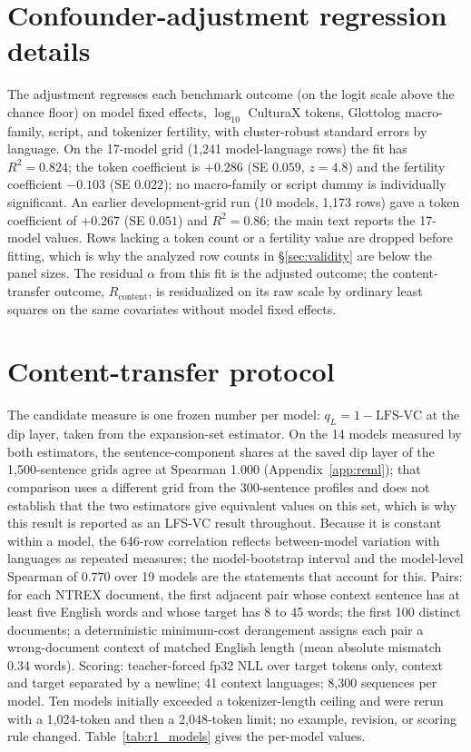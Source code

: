 \documentclass{article} %
\begin{document}
\section{Confounder-adjustment regression details}
\label{app:deflation}
The adjustment regresses each benchmark outcome (on the logit scale above the chance floor) on model fixed effects, $\log_{10}$ CulturaX tokens, Glottolog macro-family, script, and tokenizer fertility, with cluster-robust standard errors by language. On the 17-model grid (1,241 model-language rows) the fit has $R^2 = 0.824$; the token coefficient is $+0.286$ (SE $0.059$, $z = 4.8$) and the fertility coefficient $-0.103$ (SE $0.022$); no macro-family or script dummy is individually significant. An earlier development-grid run (10 models, 1,173 rows) gave a token coefficient of $+0.267$ (SE $0.051$) and $R^2 = 0.86$; the main text reports the 17-model values. Rows lacking a token count or a fertility value are dropped before fitting, which is why the analyzed row counts in \S\ref{sec:validity} are below the panel sizes. The residual $\alpha$ from this fit is the adjusted outcome; the content-transfer outcome, $R_{\mathrm{content}}$, is residualized on its raw scale by ordinary least squares on the same covariates without model fixed effects.

\section{Content-transfer protocol}
\label{app:r1}
The candidate measure is one frozen number per model: $q_L = 1 - \mathrm{LFS\text{-}VC}$ at the dip layer, taken from the expansion-set estimator. On the 14 models measured by both estimators, the sentence-component shares at the saved dip layer of the 1,500-sentence grids agree at Spearman 1.000 (Appendix~\ref{app:reml}); that comparison uses a different grid from the 300-sentence profiles and does not establish that the two estimators give equivalent values on this set, which is why this result is reported as an LFS-VC result throughout. Because it is constant within a model, the 646-row correlation reflects between-model variation with languages as repeated measures; the model-bootstrap interval and the model-level Spearman of $0.770$ over 19 models are the statements that account for this.
Pairs: for each NTREX document, the first adjacent pair whose context sentence has at least five English words and whose target has 8 to 45 words; the first 100 distinct documents; a deterministic minimum-cost derangement assigns each pair a wrong-document context of matched English length (mean absolute mismatch 0.34 words). Scoring: teacher-forced fp32 NLL over target tokens only, context and target separated by a newline; 41 context languages; 8,300 sequences per model. Ten models initially exceeded a tokenizer-length ceiling and were rerun with a 1,024-token and then a 2,048-token limit; no example, revision, or scoring rule changed. Table~\ref{tab:r1_models} gives the per-model values.
\end{document}
